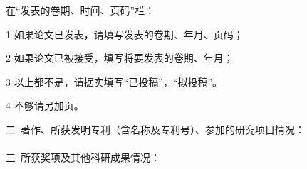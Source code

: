 \begin{resume}
在“发表的卷期、时间、页码”栏：

1 如果论文已发表，请填写发表的卷期、年月、页码；

2 如果论文已被接受，填写将要发表的卷期、年月；

3 以上都不是，请据实填写“已投稿”，“拟投稿”。

4 不够请另加页。

二\ 著作、所获发明专利（含名称及专利号）、参加的研究项目情况：
\\
\\
  
三\ 所获奖项及其他科研成果情况：
\\
\\

\end{resume}